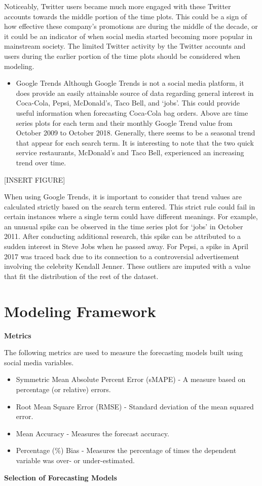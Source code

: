 \documentclass[12pt,oneside]{chicagocapstone}
\providecommand{\tightlist}{%
  \setlength{\itemsep}{0pt}\setlength{\parskip}{0pt}}
\begin{document}
Noticeably, Twitter users became much more engaged with these Twitter accounts towards the middle portion of the time plots. This could be a sign of how effective these company's promotions are during the middle of the decade, or it could be an indicator of when social media started becoming more popular in mainstream society. The limited Twitter activity by the Twitter accounts and users during the earlier portion of the time plots should be considered when modeling.
\begin{itemize}
\tightlist
\item
  Google Trends
  Although Google Trends is not a social media platform, it does provide an easily attainable source of data regarding general interest in Coca-Cola, Pepsi, McDonald's, Taco Bell, and `jobs'. This could provide useful information when forecasting Coca-Cola bag orders.
  Above are time series plots for each term and their monthly Google Trend value from October 2009 to October 2018. Generally, there seems to be a seasonal trend that appear for each search term. It is interesting to note that the two quick service restaurants, McDonald's and Taco Bell, experienced an increasing trend over time.
\end{itemize}
{[}INSERT FIGURE{]}

When using Google Trends, it is important to consider that trend values are calculated strictly based on the search term entered. This strict rule could fail in certain instances where a single term could have different meanings. For example, an unusual spike can be observed in the time series plot for `jobs' in October 2011. After conducting additional research, this spike can be attributed to a sudden interest in Steve Jobs when he passed away. For Pepsi, a spike in April 2017 was traced back due to its connection to a controversial advertisement involving the celebrity Kendall Jenner. These outliers are imputed with a value that fit the distribution of the rest of the dataset.

\newpage

\hypertarget{methodology-modeling}{%
\section*{Modeling Framework}\label{methodology-modeling}}

\textbf{Metrics}

The following metrics are used to measure the forecasting models built using social media variables.
\begin{itemize}
\item
  Symmetric Mean Absolute Percent Error (sMAPE) - A measure based on percentage (or relative) errors.
\item
  Root Mean Square Error (RMSE) - Standard deviation of the mean squared error.
\item
  Mean Accuracy - Measures the forecast accuracy.
\item
  Percentage (\%) Bias - Measures the percentage of times the dependent variable was over- or under-estimated.
\end{itemize}
\textbf{Selection of Forecasting Models}
\end{document}
